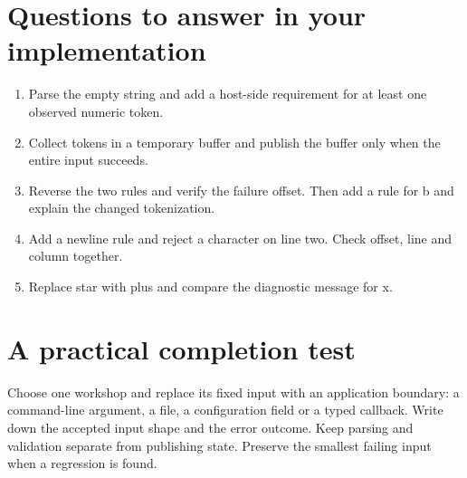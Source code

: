 \section*{Questions to answer in your implementation}
\begin{enumerate}
\item Parse the empty string and add a host-side requirement for at least one observed numeric token.
\item Collect tokens in a temporary buffer and publish the buffer only when the entire input succeeds.
\item Reverse the two rules and verify the failure offset. Then add a rule for b and explain the changed tokenization.
\item Add a newline rule and reject a character on line two. Check offset, line and column together.
\item Replace star with plus and compare the diagnostic message for x.
\end{enumerate}
\section*{A practical completion test}
Choose one workshop and replace its fixed input with an application boundary: a command-line argument, a file, a configuration field or a typed callback. Write down the accepted input shape and the error outcome. Keep parsing and validation separate from publishing state. Preserve the smallest failing input when a regression is found.

